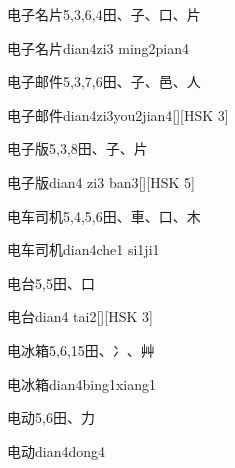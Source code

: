 \begin{entry}{电子名片}{5,3,6,4}{⽥、⼦、⼝、⽚}
  \begin{phonetics}{电子名片}{dian4zi3 ming2pian4}
  \end{phonetics}
\end{entry}

\begin{entry}{电子邮件}{5,3,7,6}{⽥、⼦、⾢、⼈}
  \begin{phonetics}{电子邮件}{dian4zi3you2jian4}[][HSK 3]
  \end{phonetics}
\end{entry}

\begin{entry}{电子版}{5,3,8}{⽥、⼦、⽚}
  \begin{phonetics}{电子版}{dian4 zi3 ban3}[][HSK 5]
  \end{phonetics}
\end{entry}

\begin{entry}{电车司机}{5,4,5,6}{⽥、⾞、⼝、⽊}
  \begin{phonetics}{电车司机}{dian4che1 si1ji1}
  \end{phonetics}
\end{entry}

\begin{entry}{电台}{5,5}{⽥、⼝}
  \begin{phonetics}{电台}{dian4 tai2}[][HSK 3]
  \end{phonetics}
\end{entry}

\begin{entry}{电冰箱}{5,6,15}{⽥、⼎、⾋}
  \begin{phonetics}{电冰箱}{dian4bing1xiang1}
  \end{phonetics}
\end{entry}

\begin{entry}{电动}{5,6}{⽥、⼒}
  \begin{phonetics}{电动}{dian4dong4}
  \end{phonetics}
\end{entry}

